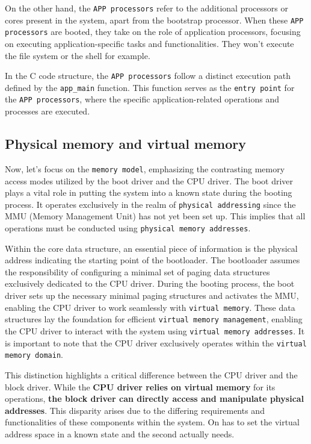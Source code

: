 On the other hand, the \texttt{APP processors} refer to the additional processors or cores present in the system, apart from the bootstrap processor. When these \texttt{APP processors} are booted, they take on the role of application processors, focusing on executing application-specific tasks and functionalities. They won't execute the file system or the shell for example.

In the C code structure, the \texttt{APP processors} follow a distinct execution path defined by the \texttt{app\_main} function. This function serves as the \texttt{entry point} for the \texttt{APP processors}, where the specific application-related operations and processes are executed.

\subsection{Physical memory and virtual memory}

Now, let's focus on the \texttt{memory model}, emphasizing the contrasting memory access modes utilized by the boot driver and the CPU driver. The boot driver plays a vital role in putting the system into a known state during the booting process. It operates exclusively in the realm of \texttt{physical addressing} since the MMU (Memory Management Unit) has not yet been set up. This implies that all operations must be conducted using \texttt{physical memory addresses}.

Within the core data structure, an essential piece of information is the physical address indicating the starting point of the bootloader. The bootloader assumes the responsibility of configuring a minimal set of paging data structures exclusively dedicated to the CPU driver. During the booting process, the boot driver sets up the necessary minimal paging structures and activates the MMU, enabling the CPU driver to work seamlessly with \texttt{virtual memory}. These data structures lay the foundation for efficient \texttt{virtual memory management}, enabling the CPU driver to interact with the system using \texttt{virtual memory addresses}. It is important to note that the CPU driver exclusively operates within the \texttt{virtual memory domain}.

This distinction highlights a critical difference between the CPU driver and the block driver. While the \textbf{CPU driver relies on virtual memory} for its operations, \textbf{the block driver can directly access and manipulate physical addresses}. This disparity arises due to the differing requirements and functionalities of these components within the system. On has to set the virtual address space in a known state and the second actually needs.


